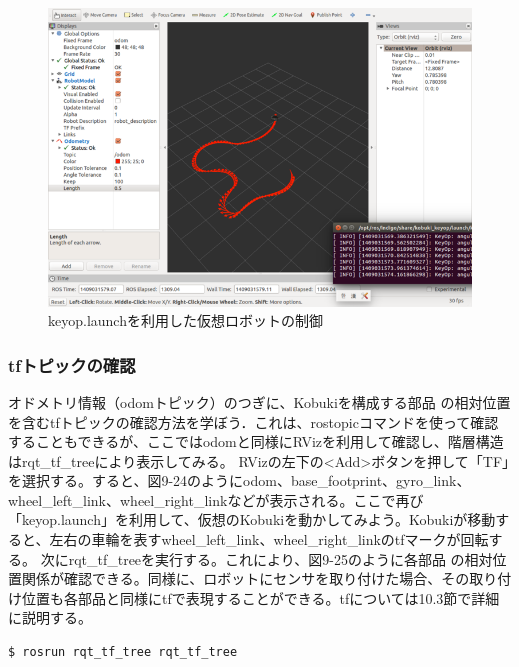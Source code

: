 \begin{itemize}
\begin{figure}[ht]
  \centering
  \includegraphics[width=\columnwidth]{pictures/chapter9/pic_09_23.png}
  \caption{keyop.launchを利用した仮想ロボットの制御}
\end{figure}

\subsubsection{tfトピックの確認}

オドメトリ情報（odomトピック）のつぎに、Kobukiを構成する部品  の相対位置を含むtfトピックの確認方法を学ぼう．これは、rostopicコマンドを使って確認することもできるが、ここではodomと同様にRVizを利用して確認し、階層構造はrqt\_tf\_treeにより表示してみる。
RVizの左下の<Add>ボタンを押して「TF」を選択する。すると、図9-24のようにodom、base\_footprint、gyro\_link、wheel\_left\_link、wheel\_right\_linkなどが表示される。ここで再び「keyop.launch」を利用して、仮想のKobukiを動かしてみよう。Kobukiが移動すると、左右の車輪を表すwheel\_left\_link、wheel\_right\_linkのtfマークが回転する。
次にrqt\_tf\_treeを実行する。これにより、図9-25のように各部品  の相対位置関係が確認できる。同様に、ロボットにセンサを取り付けた場合、その取り付け位置も各部品と同様にtfで表現することができる。tfについては10.3節で詳細に説明する。

\begin{lstlisting}[language=ROS]
$ rosrun rqt_tf_tree rqt_tf_tree
\end{lstlisting}


\end{itemize}
